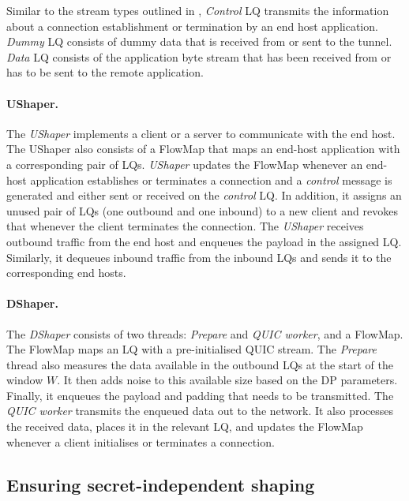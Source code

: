 Similar to the stream types outlined in , \textit{Control} LQ transmits the information about a connection establishment or termination by an end host application. 
\textit{Dummy} LQ consists of dummy data that is received from or sent to the tunnel.
\textit{Data} LQ consists of the application byte stream that has been received from or has to be sent to the remote application.


\paragraph{UShaper.}
The \textit{UShaper} implements a client or a server to communicate with the end host.
The UShaper also consists of a FlowMap that maps an end-host application with a corresponding pair of LQs.
\textit{UShaper} updates the FlowMap whenever an end-host application establishes or terminates a connection and a \textit{control} message is generated and either sent or received on the \textit{control} LQ.
In addition, it assigns an unused pair of LQs (one outbound and one inbound) to a new client and revokes that whenever the client terminates the connection.
The \textit{UShaper} receives outbound traffic from the end host and enqueues the payload in the assigned LQ.
Similarly, it dequeues inbound traffic from the inbound LQs and sends it to the corresponding end hosts.

\paragraph{DShaper.}
The \textit{DShaper} consists of two threads: \textit{Prepare} and \textit{QUIC worker}, and a FlowMap.
The FlowMap maps an LQ with a pre-initialised QUIC stream.
The \textit{Prepare} thread also measures the data available in the outbound LQs at the start of the window $W$.
It then adds noise to this available size based on the DP parameters.
Finally, it enqueues the payload and padding that needs to be transmitted.
The \textit{QUIC worker} transmits the enqueued data out to the network.
It also processes the received data, places it in the relevant LQ, and updates the FlowMap whenever a client initialises or terminates a connection.

\subsection{Ensuring secret-independent shaping}
\label{subsed:netshaper-secret-independent-shaping-implementation}


